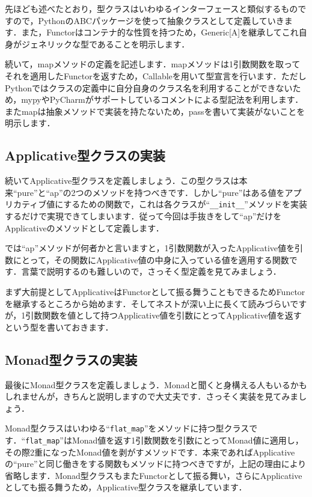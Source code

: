 
先ほども述べたとおり，型クラスはいわゆるインターフェースと類似するものですので，PythonのABCパッケージを使って抽象クラスとして定義していきます．また，Functorはコンテナ的な性質を持つため，Generic[A]を継承してこれ自身がジェネリックな型であることを明示します．

続いて，mapメソッドの定義を記述します．mapメソッドは1引数関数を取ってそれを適用したFunctorを返すため，Callableを用いて型宣言を行います．ただしPythonではクラスの定義中に自分自身のクラス名を利用することができないため，mypyやPyCharmがサポートしているコメントによる型記法を利用します．またmapは抽象メソッドで実装を持たないため，passを書いて実装がないことを明示します．

\subsection{Applicative型クラスの実装}
続いてApplicative型クラスを定義しましょう．この型クラスは本来``pure''と``ap''の2つのメソッドを持つべきです．しかし``pure''はある値をアプリカティブ値にするための関数で，これは各クラスが``\verb+__init__+''メソッドを実装するだけで実現できてしまいます．従って今回は手抜きをして``ap''だけをApplicativeのメソッドとして定義します．

では``ap''メソッドが何者かと言いますと，1引数関数が入ったApplicative値を引数にとって，その関数にApplicative値の中身に入っている値を適用する関数です．言葉で説明するのも難しいので，さっそく型定義を見てみましょう．


まず大前提としてApplicativeはFunctorとして振る舞うこともできるためFunctorを継承するところから始めます．そしてネストが深い上に長くて読みづらいですが，1引数関数を値として持つApplicative値を引数にとってApplicative値を返すという型を書いておきます．

\subsection{Monad型クラスの実装}
最後にMonad型クラスを定義しましょう．Monadと聞くと身構える人もいるかもしれませんが，きちんと説明しますので大丈夫です．さっそく実装を見てみましょう．


Monad型クラスはいわゆる``\verb+flat_map+''をメソッドに持つ型クラスです．``\verb+flat_map+''はMonad値を返す1引数関数を引数にとってMonad値に適用し，その際2重になったMonad値を剥がすメソッドです．本来であればApplicativeの``pure''と同じ働きをする関数もメソッドに持つべきですが，上記の理由により省略します．Monad型クラスもまたFunctorとして振る舞い，さらにApplicativeとしても振る舞うため，Applicative型クラスを継承しています．

